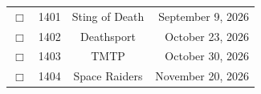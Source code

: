 \documentclass[12pt]{article}
\begin{document}
\begin{center}
\begin{longtable}[c]{cccr}
\\  %
$\Box$&1401&Sting of Death&September 9, 2026\\
$\Box$&1402&Deathsport&October 23, 2026\\
$\Box$&1403&TMTP&October 30, 2026\\
$\Box$&1404&Space Raiders&November 20, 2026\\  %

\end{longtable}\end{center}
\end{document}
